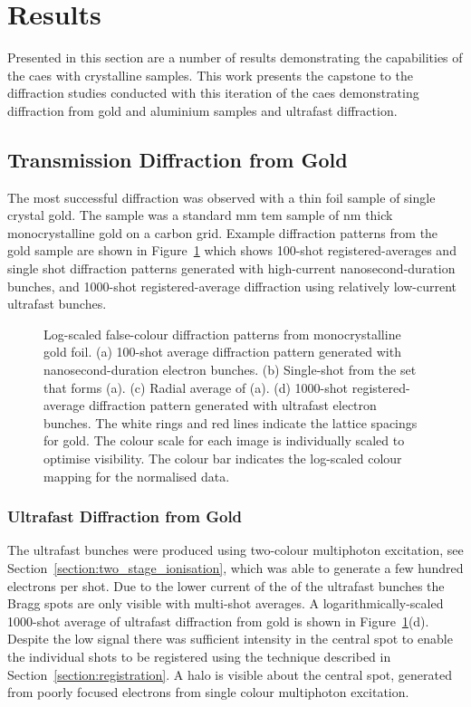 \section{Results}

Presented in this section are a number of results demonstrating the capabilities of the \gls{caes} with crystalline samples.
This work presents the capstone to the diffraction studies conducted with this iteration of the \gls{caes} demonstrating diffraction from gold and aluminium samples and ultrafast diffraction.

\subsection{Transmission Diffraction from Gold}

The most successful diffraction was observed with a thin foil sample of single crystal gold.
The sample was a standard \unit[3]{mm} \gls{tem} sample of \unit[11]{nm} thick monocrystalline gold on a carbon grid.
Example diffraction patterns from the gold sample are shown in Figure~\ref{figure:au_diffraction} which shows 100-shot registered-averages and single shot diffraction patterns generated with high-current nanosecond-duration bunches, and 1000-shot registered-average diffraction using relatively low-current ultrafast bunches.

\begin{figure}
    \center
    
    \caption[Diffraction patterns from gold.]{Log-scaled false-colour diffraction patterns from monocrystalline gold foil. (a) 100-shot average diffraction pattern generated with nanosecond-duration electron bunches. (b) Single-shot from the set that forms (a). (c) Radial average of (a). (d) 1000-shot registered-average diffraction pattern generated with ultrafast electron bunches. The white rings and red lines indicate the lattice spacings for gold. The colour scale for each image is individually scaled to optimise visibility. The colour bar indicates the log-scaled colour mapping for the normalised data.}
    \label{figure:au_diffraction}
\end{figure}

\subsubsection{Ultrafast Diffraction from Gold}

The ultrafast bunches were produced using two-colour multiphoton excitation, see Section~\ref{section:two_stage_ionisation}, which was able to generate a few hundred electrons per shot.
Due to the lower current of the of the ultrafast bunches the Bragg spots are only visible with multi-shot averages.
A logarithmically-scaled 1000-shot average of ultrafast diffraction from gold is shown in Figure~\ref{figure:au_diffraction}(d).
Despite the low signal there was sufficient intensity in the central spot to enable the individual shots to be registered using the technique described in Section~\ref{section:registration}.
A halo is visible about the central spot, generated from poorly focused electrons from single colour multiphoton excitation.

